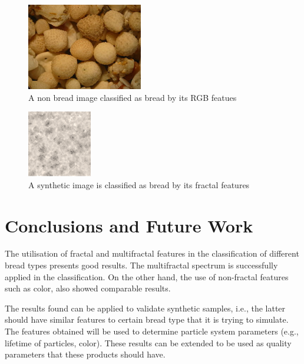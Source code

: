 \documentclass[oneside,a4paper,english,links]{amca}
\newcommand{\todo}[1]{\textbf{[TODO: #1]}}
\begin{document}
\begin{figure}[]
\centering
\includegraphics[width=0.45\textwidth]{exps/fake/320px-Sand_from_Kuta,_Bali,_Indonesia}
\caption{A non bread image classified as bread by its RGB featues}
\label{fig:fakeRGB}
\end{figure}

\begin{figure}[]
\centering
\includegraphics[width=0.25\textwidth]{exps/fake/6}
\caption{A synthetic image is classified as bread by its fractal features}
\label{fig:fakeMultifractal}
\end{figure}


\section{Conclusions and Future Work}
The utilisation of fractal and multifractal features in the classification of different bread types presents good results. The multifractal spectrum is successfully applied in the classification. On the other hand, the use of non-fractal features such as color, also showed comparable results.

The results found can be applied to validate synthetic samples, i.e., the latter should have similar features to certain bread type that it is trying to simulate. The features obtained will be used to determine particle system parameters \cite{Baravalle2011} (e.g., lifetime of particles, color). These results can be extended to be used as quality parameters that these products should have.

%

\end{document}
